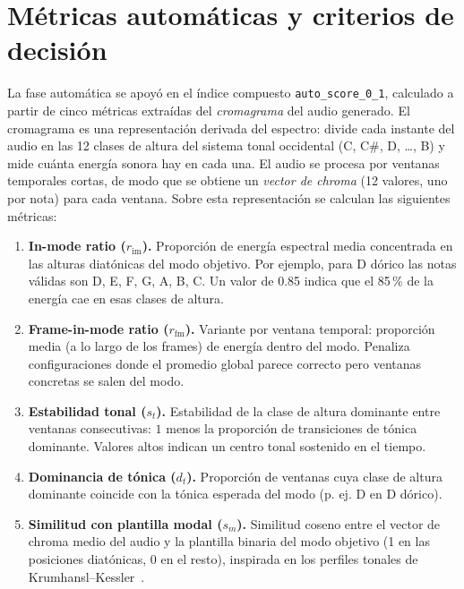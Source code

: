 \documentclass[%
    school=etsisi,%
    type=pfg,%
    degree=61CD,%
]{upm-report}
\begin{document}
\section{M\'etricas autom\'aticas y criterios de decisi\'on}

La fase autom\'atica se apoy\'o en el \'indice compuesto \texttt{auto\_score\_0\_1}, calculado a partir de cinco m\'etricas extra\'idas del \emph{cromagrama} del audio generado. El cromagrama es una representaci\'on derivada del espectro: divide cada instante del audio en las 12 clases de altura del sistema tonal occidental (C, C\#, D, \dots, B) y mide cu\'anta energ\'ia sonora hay en cada una. El audio se procesa por ventanas temporales cortas, de modo que se obtiene un \emph{vector de chroma} (12 valores, uno por nota) para cada ventana. Sobre esta representaci\'on se calculan las siguientes m\'etricas:

\begin{enumerate}
    \item \textbf{In-mode ratio ($r_\text{im}$).} Proporci\'on de energ\'ia espectral media concentrada en las alturas diat\'onicas del modo objetivo. Por ejemplo, para D d\'orico las notas v\'alidas son D, E, F, G, A, B, C. Un valor de 0.85 indica que el 85\,\% de la energ\'ia cae en esas clases de altura.

    \item \textbf{Frame-in-mode ratio ($r_\text{fm}$).} Variante por ventana temporal: proporci\'on media (a lo largo de los frames) de energ\'ia dentro del modo. Penaliza configuraciones donde el promedio global parece correcto pero ventanas concretas se salen del modo.

    \item \textbf{Estabilidad tonal ($s_t$).} Estabilidad de la clase de altura dominante entre ventanas consecutivas: $1$ menos la proporci\'on de transiciones de t\'onica dominante. Valores altos indican un centro tonal sostenido en el tiempo.

    \item \textbf{Dominancia de t\'onica ($d_t$).} Proporci\'on de ventanas cuya clase de altura dominante coincide con la t\'onica esperada del modo (p. ej. D en D d\'orico).

    \item \textbf{Similitud con plantilla modal ($s_m$).} Similitud coseno entre el vector de chroma medio del audio y la plantilla binaria del modo objetivo (1 en las posiciones diat\'onicas, 0 en el resto), inspirada en los perfiles tonales de Krumhansl--Kessler~\cite{krumhansl1982}.
\end{enumerate}
\end{document}

